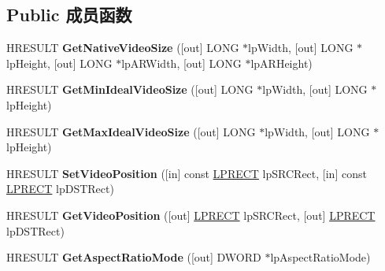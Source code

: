 \subsection*{Public 成员函数}
\begin{DoxyCompactItemize}
\item 
\mbox{\label{interface_i_v_m_r_windowless_control_a297fae27dd78f5193d39044fc6699271}} 
H\+R\+E\+S\+U\+LT {\bfseries Get\+Native\+Video\+Size} (\mbox{[}out\mbox{]} L\+O\+NG $\ast$lp\+Width, \mbox{[}out\mbox{]} L\+O\+NG $\ast$lp\+Height, \mbox{[}out\mbox{]} L\+O\+NG $\ast$lp\+A\+R\+Width, \mbox{[}out\mbox{]} L\+O\+NG $\ast$lp\+A\+R\+Height)
\item 
\mbox{\label{interface_i_v_m_r_windowless_control_a1dd0972264557ba600fba40bc9bcb505}} 
H\+R\+E\+S\+U\+LT {\bfseries Get\+Min\+Ideal\+Video\+Size} (\mbox{[}out\mbox{]} L\+O\+NG $\ast$lp\+Width, \mbox{[}out\mbox{]} L\+O\+NG $\ast$lp\+Height)
\item 
\mbox{\label{interface_i_v_m_r_windowless_control_ac68bc5b2d6812e2ada0ce627541cfea0}} 
H\+R\+E\+S\+U\+LT {\bfseries Get\+Max\+Ideal\+Video\+Size} (\mbox{[}out\mbox{]} L\+O\+NG $\ast$lp\+Width, \mbox{[}out\mbox{]} L\+O\+NG $\ast$lp\+Height)
\item 
\mbox{\label{interface_i_v_m_r_windowless_control_af07c9292913fd26a3f9af41c171a9c88}} 
H\+R\+E\+S\+U\+LT {\bfseries Set\+Video\+Position} (\mbox{[}in\mbox{]} const \hyperlink{structtag_r_e_c_t}{L\+P\+R\+E\+CT} lp\+S\+R\+C\+Rect, \mbox{[}in\mbox{]} const \hyperlink{structtag_r_e_c_t}{L\+P\+R\+E\+CT} lp\+D\+S\+T\+Rect)
\item 
\mbox{\label{interface_i_v_m_r_windowless_control_a9f74f6039e7c5793e613c0d6fdbd3cc8}} 
H\+R\+E\+S\+U\+LT {\bfseries Get\+Video\+Position} (\mbox{[}out\mbox{]} \hyperlink{structtag_r_e_c_t}{L\+P\+R\+E\+CT} lp\+S\+R\+C\+Rect, \mbox{[}out\mbox{]} \hyperlink{structtag_r_e_c_t}{L\+P\+R\+E\+CT} lp\+D\+S\+T\+Rect)
\item 
\mbox{\label{interface_i_v_m_r_windowless_control_a35a7fb2211edb925c9026b1020c51558}} 
H\+R\+E\+S\+U\+LT {\bfseries Get\+Aspect\+Ratio\+Mode} (\mbox{[}out\mbox{]} D\+W\+O\+RD $\ast$lp\+Aspect\+Ratio\+Mode)

\end{DoxyCompactItemize}
